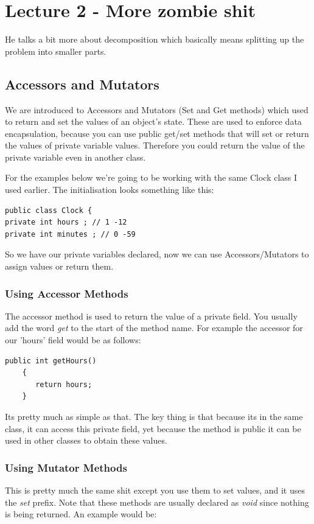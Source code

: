 \documentclass{article}
\begin{document}
\section{Lecture 2 - More zombie shit}

He talks a bit more about decomposition which basically means splitting up the problem into smaller parts.

\subsection{Accessors and Mutators}
We are introduced to Accessors and Mutators (Set and Get methods) which used to return and set the values of 
an object's state. These are used to enforce data encapsulation, because you can use public get/set methods
that will set or return the values of private variable values. Therefore you could return the value of the
private variable even in another class.

For the examples below we're going to be working with the same Clock class I used earlier. The initialisation
looks something like this: 

\begin{lstlisting}
public class Clock {
private int hours ; // 1 -12
private int minutes ; // 0 -59
\end{lstlisting}
So we have our private variables declared, now we can use Accessors/Mutators to assign values or return them.

\subsubsection{Using Accessor Methods}
The accessor method is used to return the value of a private field. You usually add the word \emph{get} to
the start of the method name. For example the accessor for our 'hours' field would be as follows:
\begin{lstlisting}
public int getHours()
	{
	   return hours;
	}
\end{lstlisting}
Its pretty much as simple as that. The key thing is that because its in the same class, it can access this private
field, yet because the method is public it can be used in other classes to obtain these values.

\subsubsection{Using Mutator Methods}
This is pretty much the same shit except you use them to set values, and it uses the \emph{set} prefix. Note that
these methods are usually declared as \emph{void} since nothing is being returned. An example would be:
\end{document}
